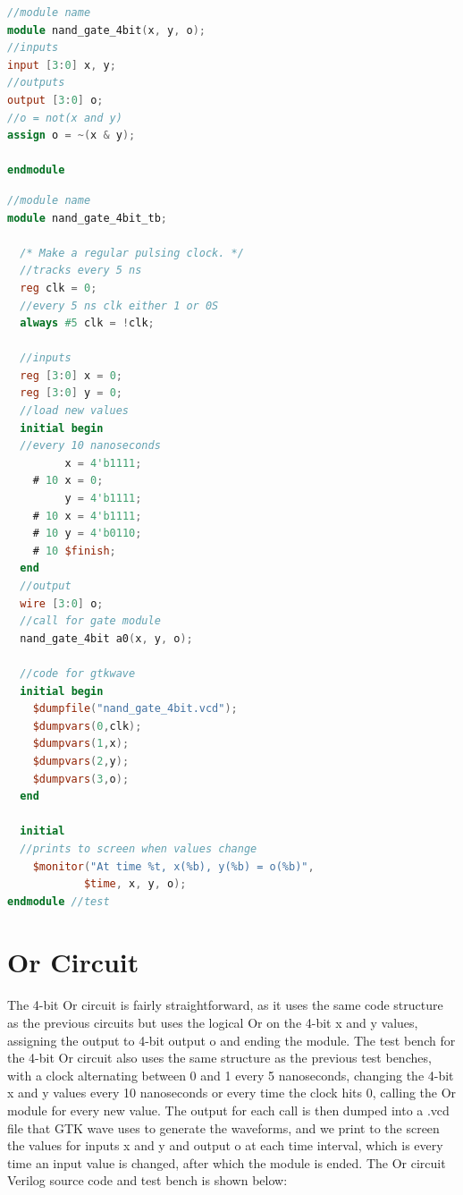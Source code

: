 \documentclass[runningheads, 12pt]{report}
\begin{document}
\begin{lstlisting}[language=Verilog, caption={Nand Circuit Verilog}]
//module name
module nand_gate_4bit(x, y, o);	
//inputs
input [3:0] x, y;		
//outputs
output [3:0] o;			
//o = not(x and y)
assign o = ~(x & y);		

endmodule
\end{lstlisting}

\begin{lstlisting}[language=Verilog, caption={Nand Circuit Test Bench}]
//module name
module nand_gate_4bit_tb;		

  /* Make a regular pulsing clock. */	
  //tracks every 5 ns
  reg clk = 0;
  //every 5 ns clk either 1 or 0S
  always #5 clk = !clk;			
  
  //inputs
  reg [3:0] x = 0;			
  reg [3:0] y = 0;
  //load new values
  initial begin		
  //every 10 nanoseconds
    	 x = 4'b1111;	
    # 10 x = 0; 
    	 y = 4'b1111;
    # 10 x = 4'b1111;			
    # 10 y = 4'b0110;
    # 10 $finish;
  end
  //output
  wire [3:0] o;		
  //call for gate module
  nand_gate_4bit a0(x, y, o);
  
  //code for gtkwave
  initial begin	
    $dumpfile("nand_gate_4bit.vcd");
    $dumpvars(0,clk);
    $dumpvars(1,x);
    $dumpvars(2,y);
    $dumpvars(3,o);
  end
  
  initial				
  //prints to screen when values change
    $monitor("At time %t, x(%b), y(%b) = o(%b)",  
    		$time, x, y, o);
endmodule //test
\end{lstlisting}

	\section{Or Circuit}
	
	The 4-bit Or circuit is fairly straightforward, as it uses the same code structure as the previous circuits but uses the logical Or on the 4-bit x and y values, assigning the output to 4-bit output o and ending the module. The test bench for the 4-bit Or circuit also uses the same structure as the previous test benches, with a clock alternating between 0 and 1 every 5 nanoseconds, changing the 4-bit x and y values every 10 nanoseconds or every time the clock hits 0, calling the Or module for every new value. The output for each call is then dumped into a .vcd file that GTK wave uses to generate the waveforms, and we print to the screen the values for inputs x and y and output o at each time interval, which is every time an input value is changed, after which the module is ended. The Or circuit Verilog source code and test bench is shown below:
\end{document}

